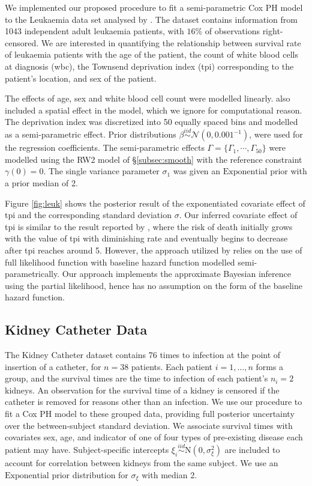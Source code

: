 \documentclass[ba]{imsart}
\begin{document}
We implemented our proposed procedure to fit a semi-parametric Cox PH model to the Leukaemia data set analysed by \cite{inlacoxph}. The dataset contains information from 1043 independent adult leukaemia patients, with $16\%$ of observations right-censored. We are interested in quantifying the relationship between survival rate of leukaemia patients with the age of the patient, the count of white blood cells at diagnosis (wbc), the Townsend deprivation index (tpi) corresponding to the patient's location, and sex of the patient.

The effects of age, sex and white blood cell count were modelled linearly. \cite{inlacoxph} also included a spatial effect in the model, which we ignore for computational reason. The deprivation index was discretized into 50 equally spaced bins and modelled as a semi-parametric effect. Prior distributions $\beta \stackrel{iid}{\sim} \mathcal{N}(0, 0.001^{-1})$, were used for the regression coefficients. The semi-parametric effects $\Gamma = \{\Gamma_{1}, \cdots, \Gamma_{50}\}$ were modelled using the RW2 model of \S\ref{subsec:smooth} with the reference constraint $\gamma(0) = 0$. The single variance parameter $\sigma_{1}$ was given an $\text{Exponential}$ prior with a prior median of 2. 

Figure \ref{fig:leuk} shows the posterior result of the exponentiated covariate effect of tpi and the corresponding standard deviation $\sigma$. Our inferred covariate effect of tpi is similar to the result reported by \cite{inlacoxph}, where the risk of death initially grows with the value of tpi with diminishing rate and eventually begins to decrease after tpi reaches around 5. However, the approach utilized by \cite{inlacoxph} relies on the use of full likelihood function with baseline hazard function modelled semi-parametrically. Our approach implements the approximate Bayesian inference using the partial likelihood, hence has no assumption on the form of the baseline hazard function. 


\subsection{Kidney Catheter Data}\label{subsec:kidney}

The Kidney Catheter dataset contains 76 times to infection at the point of insertion of a catheter, for $n = 38$ patients. Each patient $i=1,\ldots,n$ forms a group, and the survival times are the time to infection of each patient's $n_{i} = 2$ kidneys. An observation for the survival time of a kidney is censored if the catheter is removed for reasons other than an infection. We use our procedure to fit a Cox PH model to these grouped data, providing full posterior uncertainty over the between-subject standard deviation. We associate survival times with covariates sex, age, and indicator of one of four types of pre-existing disease each patient may have. Subject-specific intercepts $\xi_{i}\overset{iid}{\sim}\text{N}(0,\sigma^{2}_{\xi})$ are included to account for correlation between kidneys from the same subject. We use an $\text{Exponential}$ prior distribution for $\sigma_{\xi}$ with median 2.
\end{document}
